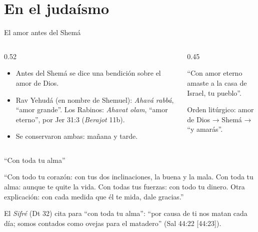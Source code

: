 \section{En el judaísmo}

\begin{frame}{El amor antes del Shemá}
\begin{columns}[c,onlytextwidth]
\begin{column}{0.52\textwidth}\small
\begin{itemize}
\item Antes del Shemá se dice una bendición sobre el amor de Dios.
\item Rav Yehudá (en nombre de Shemuel): \emph{Ahavá rabbá}, ``amor grande''. Los Rabinos: \emph{Ahavat olam}, ``amor eterno'', por Jer 31:3 (\emph{Berajot} 11b).
\item Se conservaron ambas: mañana y tarde.
\end{itemize}
\end{column}
\begin{column}{0.45\textwidth}
\begin{center}\end{center}
\small ``Con amor eterno amaste a la casa de Israel, tu pueblo''.\par\medskip
Orden litúrgico: amor de Dios → Shemá → ``y amarás''.\par
{}
\end{column}
\end{columns}
\end{frame}

\begin{frame}{``Con toda tu alma''}
\begin{tcolorbox}[colback=papiro,colframe=azul,boxrule=0.8pt,arc=3pt]
\small ``Con todo tu corazón: con tus dos inclinaciones, la buena y la mala. Con toda tu alma: aunque te quite la vida. Con todas tus fuerzas: con todo tu dinero. Otra explicación: con cada medida que él te mida, dale gracias.''
\end{tcolorbox}
\small El \emph{Sifré} (Dt 32) cita para ``con toda tu alma'': ``por causa de ti nos matan cada día; somos contados como ovejas para el matadero'' (Sal 44:22 [44:23]).\par\medskip
{}
\end{frame}

